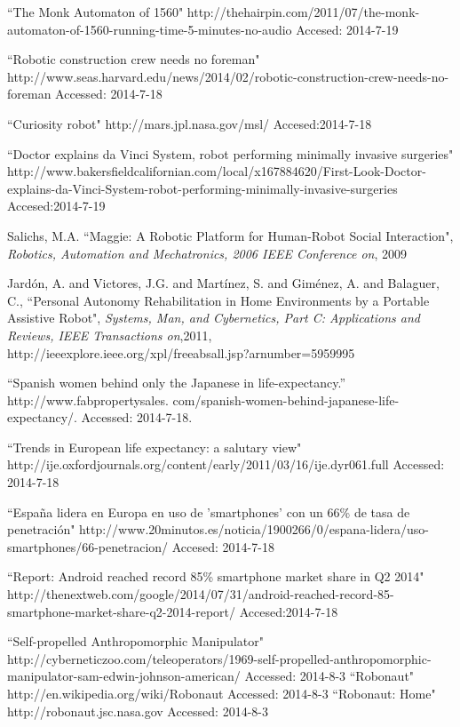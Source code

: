 \begin{thebibliography}{9}

``The Monk Automaton of 1560" http://thehairpin.com/2011/07/the-monk-automaton-of-1560-running-time-5-minutes-no-audio Accesed: 2014-7-19

``Robotic construction crew needs no foreman" http://www.seas.harvard.edu/news/2014/02/robotic-construction-crew-needs-no-foreman Accessed: 2014-7-18

``Curiosity robot" http://mars.jpl.nasa.gov/msl/ Accesed:2014-7-18

``Doctor explains da Vinci System, robot performing minimally invasive surgeries" http://www.bakersfieldcalifornian.com/local/x167884620/First-Look-Doctor-explains-da-Vinci-System-robot-performing-minimally-invasive-surgeries Accesed:2014-7-19

Salichs, M.A. ``Maggie: A Robotic Platform for Human-Robot Social Interaction", \textit{Robotics, Automation and Mechatronics, 2006 IEEE Conference on},  2009 


Jard\'on, A. and Victores, J.G. and Mart\'inez, S. and Gim\'enez, A. and Balaguer, C., ``Personal Autonomy Rehabilitation in Home Environments by a Portable Assistive Robot", \textit{Systems, Man, and Cybernetics, Part C: Applications and Reviews, IEEE Transactions on},2011, http://ieeexplore.ieee.org/xpl/freeabs\textunderscore all.jsp?arnumber=5959995


 “Spanish women behind only the Japanese in life-expectancy.” http://www.fabpropertysales.
com/spanish-women-behind-japanese-life-expectancy/. Accessed: 2014-7-18.

``Trends in European life expectancy: a salutary view" http://ije.oxfordjournals.org/content/early/2011/03/16/ije.dyr061.full Accessed: 2014-7-18

``España lidera en Europa en uso de 'smartphones' con un 66\% de tasa de penetración" http://www.20minutos.es/noticia/1900266/0/espana-lidera/uso-smartphones/66-penetracion/ Accesed: 2014-7-18

``Report: Android reached record 85\% smartphone market share in Q2 2014"
http://thenextweb.com/google/2014/07/31/android-reached-record-85-smartphone-market-share-q2-2014-report/ Accesed:2014-7-18

``Self-propelled Anthropomorphic Manipulator" http://cyberneticzoo.com/teleoperators/1969-self-propelled-anthropomorphic-manipulator-sam-edwin-johnson-american/ Accessed: 2014-8-3
``Robonaut" http://en.wikipedia.org/wiki/Robonaut Accessed: 2014-8-3
``Robonaut: Home" http://robonaut.jsc.nasa.gov Accessed: 2014-8-3



\end{thebibliography}
